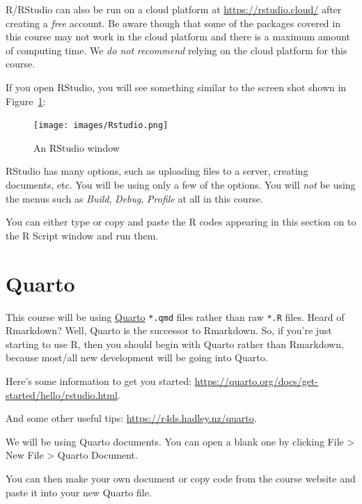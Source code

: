 \documentclass[
  letterpaper,
  DIV=11,
  numbers=noendperiod]{scrreprt}
\begin{document}
R/RStudio can also be run on a cloud platform at
\url{https://rstudio.cloud/} after creating a \emph{free} account. Be
aware though that some of the packages covered in this course may not
work in the cloud platform and there is a maximum amount of computing
time. We \emph{do not recommend} relying on the cloud platform for this
course.

If you open RStudio, you will see something similar to the screen shot
shown in Figure~\ref{fig-rstud}:

\begin{figure}

{\centering \texttt{[image: images/Rstudio.png]}

}

\caption{\label{fig-rstud}An RStudio window}

\end{figure}

RStudio has many options, such as uploading files to a server, creating
documents, etc. You will be using only a few of the options. You will
\emph{not} be using the menus such as \emph{Build}, \emph{Debug},
\emph{Profile} at all in this course.

You can either type or copy and paste the R codes appearing in this
section on to the R Script window and run them.

\hypertarget{quarto}{%
\chapter*{Quarto}\label{quarto}}

This course will be using \href{https://quarto.org/}{Quarto}
\texttt{*.qmd} files rather than raw \texttt{*.R} files. Heard of
Rmarkdown? Well, Quarto is the successor to Rmarkdown. So, if you're
just starting to use R, then you should begin with Quarto rather than
Rmarkdown, because most/all new development will be going into Quarto.

Here's some information to get you started:
\url{https://quarto.org/docs/get-started/hello/rstudio.html}.

And some other useful tips: \url{https://r4ds.hadley.nz/quarto}.

We will be using Quarto documents. You can open a blank one by clicking
File \textgreater{} New File \textgreater{} Quarto Document.

You can then make your own document or copy code from the course website
and paste it into your new Quarto file.
\end{document}
